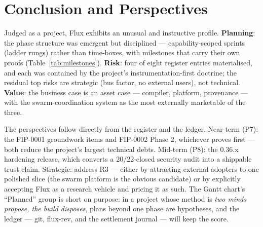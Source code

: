 \section{Conclusion and Perspectives}

Judged as a project, Flux exhibits an unusual and instructive profile. \textbf{Planning}: the phase structure was emergent but disciplined --- capability-scoped sprints (ladder rungs) rather than time-boxes, with milestones that carry their own proofs (Table~\ref{tab:milestones}). \textbf{Risk}: four of eight register entries materialised, and each was contained by the project's instrumentation-first doctrine; the residual top risks are strategic (bus factor, no external users), not technical. \textbf{Value}: the business case is an asset case --- compiler, platform, provenance --- with the swarm-coordination system as the most externally marketable of the three.

The perspectives follow directly from the register and the ledger. Near-term (P7): the FIP-0001 groundwork items and FIP-0002 Phase 2, whichever proves first --- both reduce the project's largest technical debts. Mid-term (P8): the 0.36.x hardening release, which converts a 20/22-closed security audit into a shippable trust claim. Strategic: address R3 --- either by attracting external adopters to one polished slice (the swarm platform is the obvious candidate) or by explicitly accepting Flux as a research vehicle and pricing it as such. The Gantt chart's ``Planned'' group is short on purpose: in a project whose method is \emph{two minds propose, the build disposes}, plans beyond one phase are hypotheses, and the ledger --- git, flux-rev, and the settlement journal --- will keep the score.
